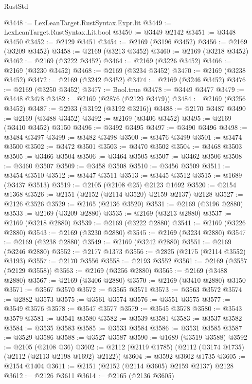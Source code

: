 \begin{lexlean}{RustStd}
\begin{coremodule}
{\begin{coremodule}
{{{{{{{{{{{{{{{{@3448 := LexLeanTarget.RustSyntax.Expr.lit
@3449 := LexLeanTarget.RustSyntax.Lit.bool
@3450 := @3449 @2142
@3451 := @3448 @3450
@3452 := @2129 @3451
@3454 := @2169 (@3196 @3452)
@3456 := @2169 (@3209 @3452)
@3458 := @2169 (@3213 @3452)
@3460 := @2169 (@3218 @3452)
@3462 := @2169 (@3222 @3452)
@3464 := @2169 (@3226 @3452)
@3466 := @2169 (@3230 @3452)
@3468 := @2169 (@3234 @3452)
@3470 := @2169 (@3238 @3452)
@3472 := @2169 (@3242 @3452)
@3474 := @2169 (@3246 @3452)
@3476 := @2169 (@3250 @3452)
@3477 := Bool.true
@3478 := @3449 @3477
@3479 := @3448 @3478
@3482 := @2169 (@2876 (@2129 @3479))
@3484 := @2169 (@3256 @3452)
@3487 := @2933 (@3192 (@3192 @3216))
@3488 := @2170 @3487
@3490 := @2169 (@3488 @3452)
@3492 := @2169 (@3406 @3452)
@3495 := @2169 (@3410 @3452) @3150
@3496 := @3492 @3495
@3497 := @3490 @3496
@3498 := @3484 @3497
@3499 := @3482 @3498
@3500 := @3476 @3499
@3501 := @3474 @3500
@3502 := @3472 @3501
@3503 := @3470 @3502
@3504 := @3468 @3503
@3505 := @3466 @3504
@3506 := @3464 @3505
@3507 := @3462 @3506
@3508 := @3460 @3507
@3509 := @3458 @3508
@3510 := @3456 @3509
@3511 := @3454 @3510
@3512 := @3447 @3511
@3513 := @3445 @3512
@3515 := @1689 (@3437 @3513)
@3519 := @2105 (@2108 @25) @2123 @1692
@3520 := @2154 @1368
@3526 := @2151 (@2152 (@2114 @3520) @2159 @2137) @2128
@3527 := @2126 @3526
@3529 := @2165 (@2136 @3520)
@3531 := @2169 (@3196 @2880)
@3533 := @2169 (@3209 @2880)
@3535 := @2169 (@3213 @2880)
@3537 := @2169 (@3218 @2880)
@3539 := @2169 (@3222 @2880)
@3541 := @2169 (@3226 @2880)
@3543 := @2169 (@3230 @2880)
@3545 := @2169 (@3234 @2880)
@3547 := @2169 (@3238 @2880)
@3549 := @2169 (@3242 @2880)
@3551 := @2169 (@3246 @2880)
@3552 := @2177 @1373
@3556 := @2825 (@2175 (@2114 @3552) @3193)
@3557 := @2170 @3556
@3558 := @2193 @3552
@3561 := @2169 (@3557 (@2129 @3558))
@3563 := @2169 (@3256 @2880)
@3565 := @2169 (@3488 @2880)
@3567 := @2169 (@3406 @2880)
@3570 := @2169 (@3410 @2880) @3150
@3571 := @3567 @3570
@3572 := @3565 @3571
@3573 := @3563 @3572
@3574 := @2882 @3573
@3575 := @3561 @3574
@3576 := @3551 @3575
@3577 := @3549 @3576
@3578 := @3547 @3577
@3579 := @3545 @3578
@3580 := @3543 @3579
@3581 := @3541 @3580
@3582 := @3539 @3581
@3583 := @3537 @3582
@3584 := @3535 @3583
@3585 := @3533 @3584
@3586 := @3531 @3585
@3587 := @3529 @3586
@3588 := @3527 @3587
@3590 := @1689 (@3519 @3588)
@3592 := @2105 (@2108 @36)
@3602 := @2112 (@2119 @1785) (@2112 (@3174 @1735) (@2112 (@2113 @2198 @1692) @2122))
@3604 := @3592 @3602 @1735
@3605 := @2154 @1404
@3611 := @2151 (@2152 (@2114 @3605) @2159 @2137) @2128
@3612 := @2126 @3611
@3614 := @2165 (@2136 @3605)
}}}}}}}}}}}}}}}}
\end{coremodule}}
\end{coremodule}
\end{lexlean}
